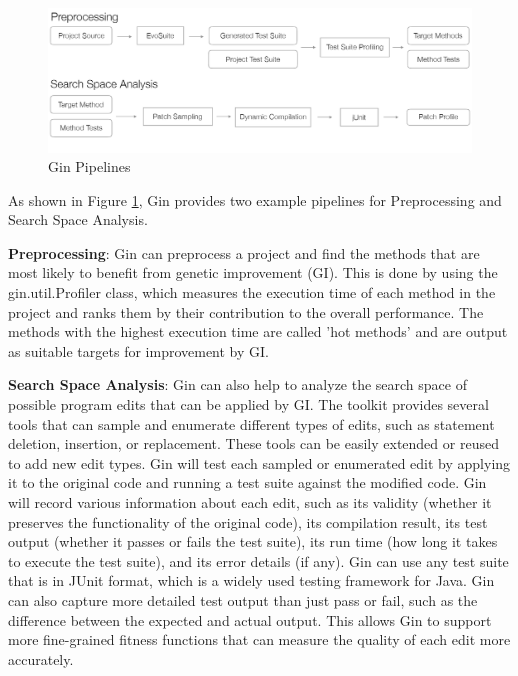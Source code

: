 \begin{figure}[h]
  \centering
  \includegraphics[width=1.0\textwidth]{img/Gin_Pipelines.png}
  \caption{Gin Pipelines~\cite{DBLP:conf/gecco/BrownleePABWW19}}
  \label{fig:GinPipelines}
\end{figure}


As shown in Figure \ref{fig:GinPipelines}, Gin provides two example pipelines for Preprocessing and Search Space Analysis.\par

\textbf{Preprocessing}: Gin can preprocess a project and find the methods that are most likely to benefit from genetic improvement (GI). This is done by using the gin.util.Profiler class, which measures the execution time of each method in the project and ranks them by their contribution to the overall performance. The methods with the highest execution time are called 'hot methods' and are output as suitable targets for improvement by GI.\par

\textbf{Search Space Analysis}: Gin can also help to analyze the search space of possible program edits that can be applied by GI. The toolkit provides several tools that can sample and enumerate different types of edits, such as statement deletion, insertion, or replacement. These tools can be easily extended or reused to add new edit types. Gin will test each sampled or enumerated edit by applying it to the original code and running a test suite against the modified code. Gin will record various information about each edit, such as its validity (whether it preserves the functionality of the original code), its compilation result, its test output (whether it passes or fails the test suite), its run time (how long it takes to execute the test suite), and its error details (if any). Gin can use any test suite that is in JUnit format, which is a widely used testing framework for Java. Gin can also capture more detailed test output than just pass or fail, such as the difference between the expected and actual output. This allows Gin to support more fine-grained fitness functions that can measure the quality of each edit more accurately.\par


